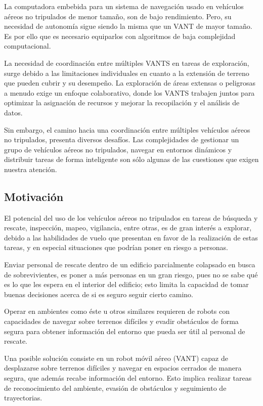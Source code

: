 La computadora embebida para un sistema de navegación usado en vehículos aéreos no tripulados de menor tamaño, son de bajo rendimiento. Pero, su necesidad de autonomía sigue siendo la misma que un VANT de mayor tamaño. Es por ello que es necesario equiparlos con algoritmos de baja complejidad computacional.

La necesidad de coordinación entre múltiples VANTS en tareas de exploración, surge debido a las limitaciones individuales en cuanto a la extensión de terreno que pueden cubrir y su desempeño. La exploración de áreas extensas o peligrosas a menudo exige un enfoque colaborativo, donde los VANTS trabajen juntos para optimizar la asignación de recursos y mejorar la recopilación y el análisis de datos.

Sin embargo, el camino hacia una coordinación entre múltiples vehículos aéreos no tripulados, presenta diversos desafíos. Las complejidades de gestionar un grupo de vehículos aéreos no tripulados, navegar en entornos dinámicos y distribuir tareas de forma inteligente son sólo algunas de las cuestiones que exigen nuestra atención. %

\subsection*{Motivación}

El potencial del uso de los vehículos aéreos no tripulados en tareas de búsqueda y rescate, inspección, mapeo, vigilancia, entre otras, es de gran interés a explorar, debido a las habilidades de vuelo que presentan en favor de la realización de estas tareas, y en especial situaciones que podrían poner en riesgo a personas.

Enviar personal de rescate dentro de un edificio parcialmente colapsado en busca de sobrevivientes, es poner a más personas en un gran riesgo, pues no se sabe qué es lo que les espera en el interior del edificio; esto limita la capacidad de tomar buenas decisiones acerca de si es seguro seguir cierto camino.

Operar en ambientes como éste u otros similares requieren de robots con capacidades de navegar sobre terrenos difíciles y evadir obstáculos de forma segura para obtener información del entorno que pueda ser útil al personal de rescate.

Una posible solución consiste en un robot móvil aéreo (VANT) capaz de desplazarse sobre terrenos difíciles y navegar en espacios cerrados de manera segura, que además recabe información del entorno. Esto implica realizar tareas de reconocimiento del ambiente, evasión de obstáculos y seguimiento de trayectorias.

